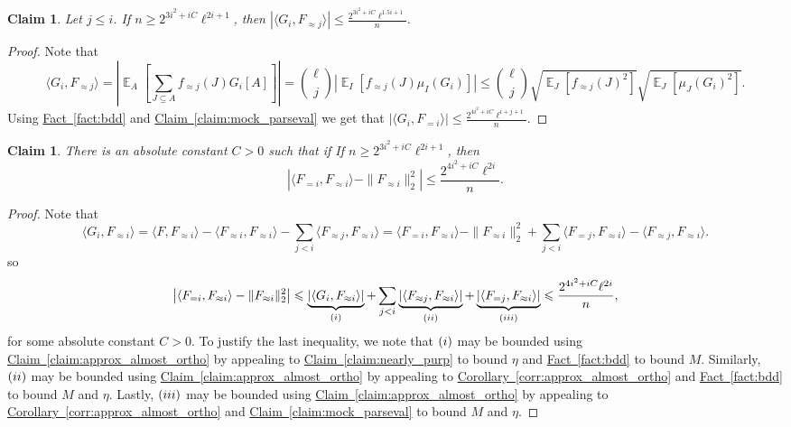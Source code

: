 \documentclass[11pt]{article}
\newcommand{\expref}[2]{\texorpdfstring{\hyperref[#2]{#1~\ref{#2}}}{#1~\ref{#2}}}
\newtheorem{claim}[theorem]{Claim}
\newcommand{\rom}[1]{\uppercase\expandafter{\romannumeral #1\relax}}
\newcommand\card[1]{\left| {#1} \right|}
\newcommand\Expect[2]{{\mathop{\mathbb{E}}_{#1}\left[ {#2} \right]}}
\newcommand\norm[1]{\| #1 \|}
\newcommand\inner[2]{\langle{#1},{#2}\rangle}
\renewcommand\geq{\geqslant}
\renewcommand\leq{\leqslant}
\newcommand\lvlfn[2]{{#1}_{={#2}}}
\newcommand\approxlvlfn[2]{{#1}_{\approx{#2}}}
\begin{document}
\begin{claim}
  Let $j\leq i$. If $n\geq 2^{3i^2+iC} \ell^{2i+1}$, then $\card{\inner{G_i}{\approxlvlfn{F}{j}}}\leq \frac{2^{3i^2+iC} \ell^{1.5i + 1}}{n}$.
\end{claim}
\begin{proof}
Note that
\[
\inner{G_i}{\approxlvlfn{F}{j}}
=\card{\Expect{A}{\sum\limits_{J\subseteq A} \approxlvlfn{f}{j}(J) G_i[A]}}
={\ell \choose j}\card{\Expect{I}{\approxlvlfn{f}{j}(J) \mu_I(G_i)}}
\leq
{\ell \choose j}\sqrt{\Expect{J}{\approxlvlfn{f}{j}(J)^2}}
\sqrt{\Expect{J}{\mu_J(G_i)^2}}.
\]
Using \expref{Fact}{fact:bdd} and \expref{Claim}{claim:mock_parseval} we get that
$\card{\inner{G_i}{\lvlfn{F}{i}}}\leq \frac{2^{4i^2+iC} \ell^{i+j+1}}{n}$.
\end{proof}
\begin{claim}\label{claim:apx2}
  There is an absolute constant $C>0$ such that if
  If $n\geq 2^{3i^2+iC} \ell^{2i+1}$, then
  \[
  \card{\inner{\lvlfn{F}{i}}{\approxlvlfn{F}{i}}
-\norm{\approxlvlfn{F}{i}}_2^2}\leq \frac{2^{4i^2+iC} \ell^{2i}}{n}.
\]
\end{claim}
\begin{proof}
Note that
\[
\inner{G_i}{\approxlvlfn{F}{i}}
=\inner{F}{\approxlvlfn{F}{i}}
-\inner{\approxlvlfn{F}{i}}{\approxlvlfn{F}{i}}
-\sum\limits_{j<i}\inner{\approxlvlfn{F}{j}}{\approxlvlfn{F}{i}}
=\inner{\lvlfn{F}{i}}{\approxlvlfn{F}{i}}-\norm{\approxlvlfn{F}{i}}_2^2
+\sum\limits_{j<i}\inner{\lvlfn{F}{j}}{\approxlvlfn{F}{i}}-\inner{\approxlvlfn{F}{j}}{\approxlvlfn{F}{i}}.
\]
so
\[
\card{\inner{\lvlfn{F}{i}}{\approxlvlfn{F}{i}}
-\norm{\approxlvlfn{F}{i}}_2^2}
\leq
\underbrace{\card{\inner{G_i}{\approxlvlfn{F}{i}}}}_{(\rom{1})}
+\sum\limits_{j<i}\underbrace{\card{\inner{\approxlvlfn{F}{j}}{\approxlvlfn{F}{i}}}}_{(\rom{2})}+\underbrace{\card{\inner{\lvlfn{F}{j}}{\approxlvlfn{F}{i}}}}_{(\rom{3})}
\leq \frac{2^{4i^2+iC} \ell^{2i}}{n},
\]
for some absolute constant $C>0$. To justify the last inequality, we note that $(\rom{1})$ may be bounded using \expref{Claim}{claim:approx_almost_ortho}
by appealing to \expref{Claim}{claim:nearly_purp} to bound $\eta$ and \expref{Fact}{fact:bdd} to bound $M$. Similarly, $(\rom{2})$ may be bounded using
\expref{Claim}{claim:approx_almost_ortho} by appealing to \expref{Corollary}{corr:approx_almost_ortho} and \expref{Fact}{fact:bdd}
to bound $M$ and $\eta$. Lastly, $(\rom{3})$ may be bounded using
\expref{Claim}{claim:approx_almost_ortho} by appealing to \expref{Corollary}{corr:approx_almost_ortho} and \expref{Claim}{claim:mock_parseval}
to bound $M$ and $\eta$.
\end{proof}
\end{document}
